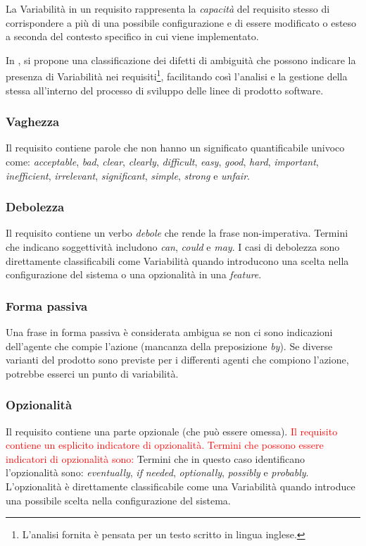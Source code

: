 \documentclass[12pt]{report}
\newcommand{\torevise}[1]{\textcolor{red}{#1}}
\begin{document}
\begin{mdframed}
\small
La \textsf{Variabilità} in un requisito rappresenta la \textit{capacità} del requisito stesso di corrispondere a più di una possibile configurazione e di essere modificato o esteso a seconda del contesto specifico in cui viene implementato.
\end{mdframed}

In \cite{oai:it.cnr:prodotti:458001}, si propone una classificazione dei difetti di ambiguità che possono indicare la presenza di Variabilità nei requisiti\footnote{L’analisi fornita è pensata per un testo scritto in lingua inglese.}, facilitando così l'analisi e la gestione della stessa all'interno del processo di sviluppo delle linee di prodotto software.


\subsubsection{Vaghezza}
Il requisito contiene parole che non hanno un significato quantificabile univoco come: \textit{acceptable}, \textit{bad}, \textit{clear}, \textit{clearly}, \textit{difficult}, \textit{easy}, \textit{good}, \textit{hard}, \textit{important}, \textit{inefficient}, \textit{irrelevant}, \textit{significant}, \textit{simple}, \textit{strong} e \textit{unfair}.


\subsubsection{Debolezza}
Il requisito contiene un verbo \textit{debole} che rende la frase non-imperativa. Termini che indicano soggettività includono \textit{can}, \textit{could} e \textit{may}. I casi di debolezza sono direttamente classificabili come Variabilità quando introducono una scelta nella configurazione del sistema o una opzionalità in una \textit{feature}.


\subsubsection{Forma passiva}
Una frase in forma passiva è considerata ambigua se non ci sono indicazioni dell'agente che compie l'azione (mancanza della preposizione \textit{by}). Se diverse varianti del prodotto sono previste per i differenti agenti che compiono l'azione, potrebbe esserci un punto di variabilità.


\subsubsection{Opzionalità}
Il requisito contiene una parte opzionale (che può essere omessa). \torevise{Il requisito contiene un esplicito indicatore di opzionalità. Termini che possono essere indicatori di opzionalità sono:} Termini che in questo caso identificano l'opzionalità sono: \textit{eventually}, \textit{if} \textit{needed}, \textit{optionally}, \textit{possibly} e \textit{probably}. L'opzionalità è direttamente classificabile come una Variabilità quando introduce una possibile scelta nella configurazione del sistema.
\end{document}
